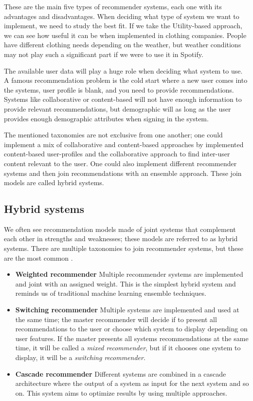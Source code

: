 \documentclass{kththesis}
\begin{document}
These are the main five types of recommender systems, each one with its advantages and disadvantages. When deciding what type of system we want to implement, we need to study the best fit. If we take the Utility-based approach, we can see how useful it can be when implemented in clothing companies. People have different clothing needs depending on the weather, but weather conditions may not play such a significant part if we were to use it in Spotify.

The available user data will play a huge role when deciding what system to use. A famous recommendation problem is the cold start \cite{coldstart} where a new user comes into the systems, user profile is blank, and you need to provide recommendations. Systems like collaborative or content-based will not have enough information to provide relevant recommendations, but demographic will as long as the user provides enough demographic attributes when signing in the system.

The mentioned taxonomies are not exclusive from one another; one could implement a mix of collaborative and content-based approaches by implemented content-based user-profiles and the collaborative approach to find inter-user content relevant to the user. One could also implement different recommender systems and then join recommendations with an ensemble approach. These join models are called hybrid systems.

\subsection{Hybrid systems}
We often see recommendation models made of joint systems that complement each other in strengths and weaknesses; these models are referred to as hybrid systems. There are multiple taxonomies to join recommender systems, but these are the most common \cite{Burke_hybrid}.

\begin{itemize}
    \item \textbf{Weighted recommender} Multiple recommender systems are implemented and joint with an assigned weight. This is the simplest hybrid system and reminds us of traditional machine learning ensemble techniques.
    
    \item \textbf{Switching recommender} Multiple systems are implemented and used at the same time; the master recommender will decide if to present all recommendations to the user or choose which system to display depending on user features. If the master presents all systems recommendations at the same time, it will be called a \textit{mixed recommender}, but if it chooses one system to display, it will be a \textit{switching recommender}.
    \item \textbf{Cascade recommender} Different systems are combined in a cascade architecture where the output of a system as input for the next system and so on. This system aims to optimize results by using multiple approaches.
\end{itemize}
\end{document}
